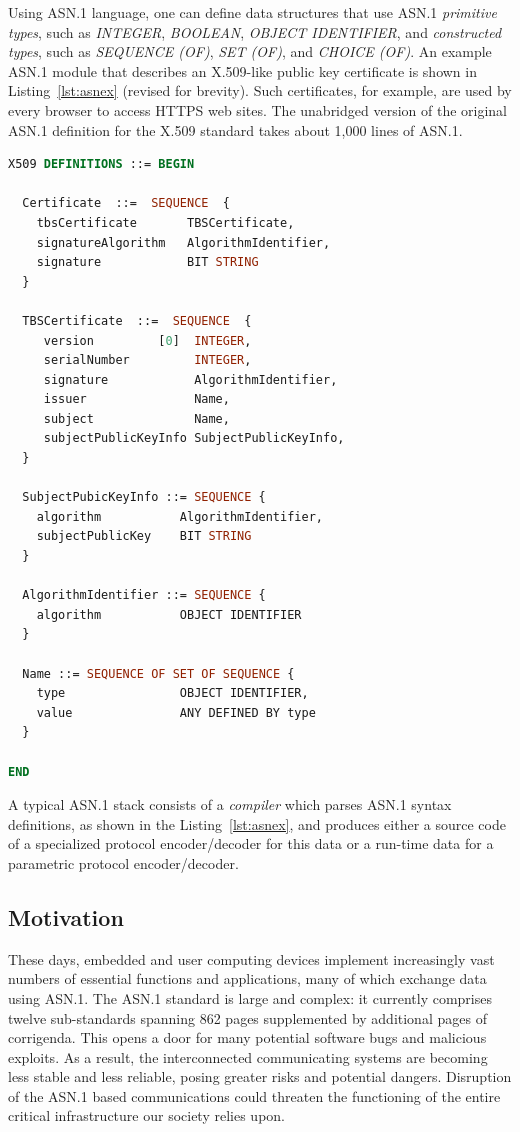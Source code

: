 \documentclass[10p,conference]{IEEEtran}
\begin{document}
Using ASN.1 language, one can define data structures that use
ASN.1 {\it primitive types}, such as \emph{INTEGER}, \emph{BOOLEAN}, \emph{OBJECT
IDENTIFIER}, and {\it constructed types}, such as \emph{SEQUENCE (OF)},
\emph{SET (OF)}, and \emph{CHOICE (OF)}. An example ASN.1 module that
describes an X.509-like public key certificate is shown in
Listing~\ref{lst:asnex} (revised for brevity). Such certificates, for example, are
used by every browser to access HTTPS web sites. The unabridged
version of the original ASN.1 definition for the X.509 standard takes
about 1,000 lines of ASN.1. 

\begin{lstlisting}[language=ASN1,label=lst:asnex,
  caption={ASN.1 example of X.509 certificates}]
X509 DEFINITIONS ::= BEGIN

  Certificate  ::=  SEQUENCE  {
    tbsCertificate       TBSCertificate,
    signatureAlgorithm   AlgorithmIdentifier,
    signature            BIT STRING
  }

  TBSCertificate  ::=  SEQUENCE  {
     version         [0]  INTEGER,
     serialNumber         INTEGER,
     signature            AlgorithmIdentifier,
     issuer               Name,
     subject              Name,
     subjectPublicKeyInfo SubjectPublicKeyInfo,
  }

  SubjectPubicKeyInfo ::= SEQUENCE {
    algorithm           AlgorithmIdentifier,
    subjectPublicKey    BIT STRING
  }

  AlgorithmIdentifier ::= SEQUENCE {
    algorithm           OBJECT IDENTIFIER
  }

  Name ::= SEQUENCE OF SET OF SEQUENCE {
    type                OBJECT IDENTIFIER,
    value               ANY DEFINED BY type
  }

END
\end{lstlisting}


A typical ASN.1 stack consists of a \textit{compiler} which parses
ASN.1 syntax definitions, as shown in the Listing~\ref{lst:asnex}, and
produces either a source code of a specialized protocol encoder/decoder for this data or a run-time data for a parametric protocol
encoder/decoder. 
  
\subsection{Motivation}

These days, embedded and user computing devices implement increasingly
vast numbers of essential functions and applications, many of which
exchange data using ASN.1. The ASN.1 standard is large and complex: it
currently comprises twelve sub-standards spanning 862 pages
supplemented by additional pages of corrigenda. This opens a door for
many potential software bugs and malicious exploits. As a result, the
interconnected communicating systems are becoming less stable and less
reliable, posing greater risks and potential dangers. Disruption of
the ASN.1 based communications could threaten the functioning of the
entire critical infrastructure our society relies upon.
\end{document}
